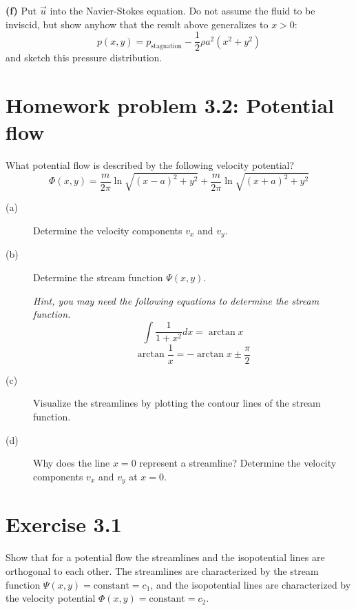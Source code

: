 \documentclass[a4paper, 10pt]{article}
\begin{document}
{\bf (f)} Put $\vec{u}$ into the Navier-Stokes equation. Do not assume the fluid to be inviscid, but show anyhow that the result above generalizes to $x>0$:
\begin{equation}
p(x,y) = p_\mathrm{stagnation}-\frac{1}{2}\rho a^2 (x^2+y^2)
\end{equation}
and sketch this pressure distribution.

\section*{Homework problem 3.2: Potential flow}
What potential flow is described by the following velocity potential?
\begin{equation}
\Phi(x,y) = \frac{m}{2\pi}\ln\sqrt{(x-a)^2 + y^2} + \frac{m}{2\pi}\ln\sqrt{(x+a)^2+y^2}
\end{equation}

\begin{description}
	\item[(a)]
	Determine the velocity components $v_x$ and $v_y$.
	\item[(b)]
	Determine the stream function $\Psi(x,y)$.
	
	\textit{Hint, you may need the following equations to determine the stream function.}
	\begin{equation*}
	\int\frac{1}{1+x^2}dx=\arctan x
	\end{equation*}
	\begin{equation*}
	\arctan \frac{1}{x} = -\arctan x\pm\frac{\pi}{2}
	\end{equation*}
	\item[(c)]
	Visualize the streamlines by plotting the contour lines of the stream function.
	\item[(d)]
	Why does the line $x=0$ represent a streamline? Determine the velocity components $v_x$ and $v_y$ at $x=0$.
\end{description}



\newpage


\section*{Exercise 3.1}
Show that for a potential flow the streamlines and the isopotential lines are orthogonal to each other. The streamlines are characterized by the stream function $\Psi(x,y)=\mathrm{constant}=c_1$, and the isopotential lines are characterized by the velocity potential $\Phi(x,y)=\mathrm{constant}=c_2$.
\end{document}
